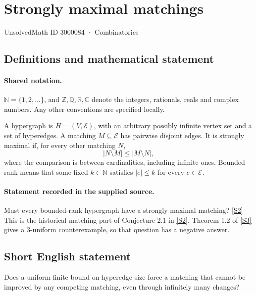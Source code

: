 \documentclass[11pt]{article}
\newcommand{\sref}[2]{\hyperlink{source:#1:#2}{[S#2]}}
\begin{document}
\setcounter{section}{3000083}
\section{Strongly maximal matchings}\label{3000084}
{\small\sffamily UnsolvedMath ID 3000084 · Combinatorics}
\subsection{Definitions and mathematical statement}

\paragraph{Shared notation.}$\mathbb N=\{1,2,\ldots\}$, and $\mathbb Z,\mathbb Q,\mathbb R,\mathbb C$ denote the integers, rationals, reals and complex numbers. Any other conventions are specified locally.


A hypergraph is $H=(V,\mathcal E)$, with an arbitrary possibly infinite vertex set and a set of hyperedges. A matching $M\subseteq\mathcal E$ has pairwise disjoint edges. It is strongly maximal if, for every other matching $N$, \[|N\setminus M|\le |M\setminus N|,\] where the comparison is between cardinalities, including infinite ones. Bounded rank means that some fixed $k\in\mathbb N$ satisfies $|e|\le k$ for every $e\in\mathcal E$.
\paragraph{Statement recorded in the supplied source.}
Must every bounded-rank hypergraph have a strongly maximal matching? \sref{3000084}{2}
This is the historical matching part of Conjecture 2.1 in \sref{3000084}{2}. Theorem 1.2 of \sref{3000084}{3} gives a 3-uniform counterexample, so that question has a negative answer.
\subsection{Short English statement}
Does a uniform finite bound on hyperedge size force a matching that cannot be improved by any competing matching, even through infinitely many changes?
\end{document}
